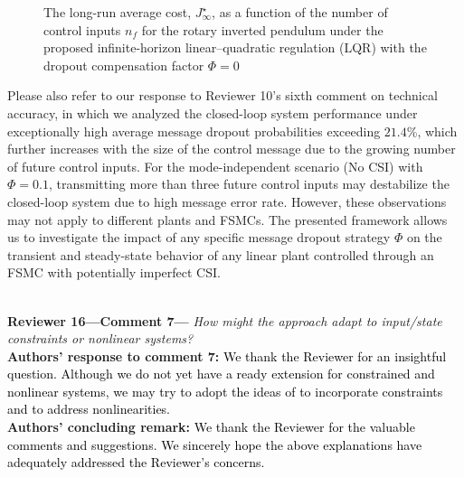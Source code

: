 \begin{bibunit}[alpha]
{\begin{figure}[h!]
\begin{center}
\caption{The long-run average cost, $J_{\infty}^{\star}$, as a function of the number of control inputs $n_f$ for the rotary inverted pendulum under the proposed infinite-horizon linear–quadratic regulation (LQR) with the dropout compensation factor $\mathit{\Phi}=0$}
\end{center}
\end{figure}
Please also refer to our response to Reviewer 10's sixth comment on technical accuracy, in which we analyzed the closed-loop system performance under exceptionally high average message dropout probabilities exceeding $21.4$\%, which further increases with the size of the control message due to the growing number of future control inputs.
For the mode-independent scenario (No CSI) with $\mathit{\Phi}=0.1$, transmitting more than three future control inputs may destabilize the closed-loop system due to high message error rate. However, these observations may not apply to different plants and FSMCs. The presented framework allows us to investigate the impact of any specific message dropout strategy $\mathit{\Phi}$ on the transient and steady-state behavior of any linear plant controlled through an FSMC with potentially imperfect CSI.}\\[4mm]
\textbf{Reviewer 16---Comment 7---}\textit{%
How might the approach adapt to input/state constraints or nonlinear systems?}\\[2mm]
\textbf{Authors' response to comment 7:} \textcolor{black}{We thank the Reviewer for an insightful question. Although we do not yet have a ready extension for constrained and nonlinear systems, we may try to adopt the ideas of \cite{KOTHARE19961361} to incorporate constraints and \cite{10273597} to address nonlinearities.}\\[4mm]
\textbf{Authors' concluding remark:} \textcolor{black}{We thank the Reviewer for the valuable comments and suggestions. We sincerely hope the above explanations have adequately addressed the Reviewer's concerns.}
\putbib
\end{bibunit}